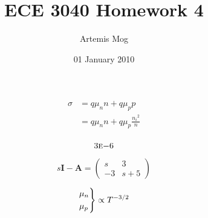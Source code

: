 \documentclass{article}
\title{ECE 3040 Homework 4}
\date{01 January 2010}
\author{Artemis Mog}
\begin{document}
\maketitle

\setcounter{section}{4}
\section{}
\subsection{}

\begin{equation*}
\begin{aligned}
\sigma &= q \mu_n n + q \mu_p p \\
&= q \mu_n n + q \mu_p \frac{{n_i}^2}{n} \\
\end{aligned}
\end{equation*}

\[ 3 \textsc{e} {-6} \]

\[
s \bm I - \bm A = \begin{pmatrix}
s & 3 \\
-3 & s+5 \end{pmatrix}
\]

\begin{equation*}
\begin{rcases}
\mu_n \\
\mu_p
\end{rcases}
\propto T^{-3/2}
\end{equation*}
\end{document}
